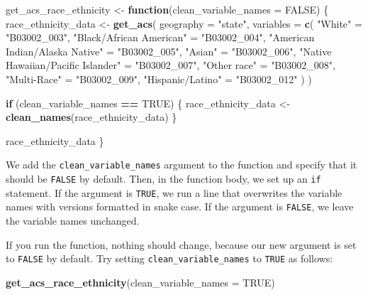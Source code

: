 \documentclass[
]{book}
\newenvironment{Shaded}{\begin{snugshade}}{\end{snugshade}}
\newcommand{\AttributeTok}[1]{\textcolor[rgb]{0.13,0.29,0.53}{#1}}
\newcommand{\ConstantTok}[1]{\textcolor[rgb]{0.56,0.35,0.01}{#1}}
\newcommand{\ControlFlowTok}[1]{\textcolor[rgb]{0.13,0.29,0.53}{\textbf{#1}}}
\newcommand{\FunctionTok}[1]{\textcolor[rgb]{0.13,0.29,0.53}{\textbf{#1}}}
\newcommand{\NormalTok}[1]{#1}
\newcommand{\OtherTok}[1]{\textcolor[rgb]{0.56,0.35,0.01}{#1}}
\newcommand{\SpecialCharTok}[1]{\textcolor[rgb]{0.81,0.36,0.00}{\textbf{#1}}}
\newcommand{\StringTok}[1]{\textcolor[rgb]{0.31,0.60,0.02}{#1}}
\begin{document}
\begin{Shaded}
\begin{Highlighting}[]
\NormalTok{get\_acs\_race\_ethnicity }\OtherTok{\textless{}{-}} \ControlFlowTok{function}\NormalTok{(}\AttributeTok{clean\_variable\_names =} \ConstantTok{FALSE}\NormalTok{) \{}
\NormalTok{  race\_ethnicity\_data }\OtherTok{\textless{}{-}}
    \FunctionTok{get\_acs}\NormalTok{(}
      \AttributeTok{geography =} \StringTok{"state"}\NormalTok{,}
      \AttributeTok{variables =} \FunctionTok{c}\NormalTok{(}
        \StringTok{"White"} \OtherTok{=} \StringTok{"B03002\_003"}\NormalTok{,}
        \StringTok{"Black/African American"} \OtherTok{=} \StringTok{"B03002\_004"}\NormalTok{,}
        \StringTok{"American Indian/Alaska Native"} \OtherTok{=} \StringTok{"B03002\_005"}\NormalTok{,}
        \StringTok{"Asian"} \OtherTok{=} \StringTok{"B03002\_006"}\NormalTok{,}
        \StringTok{"Native Hawaiian/Pacific Islander"} \OtherTok{=} \StringTok{"B03002\_007"}\NormalTok{,}
        \StringTok{"Other race"} \OtherTok{=} \StringTok{"B03002\_008"}\NormalTok{,}
        \StringTok{"Multi{-}Race"} \OtherTok{=} \StringTok{"B03002\_009"}\NormalTok{,}
        \StringTok{"Hispanic/Latino"} \OtherTok{=} \StringTok{"B03002\_012"}
\NormalTok{      )}
\NormalTok{    )}

  \ControlFlowTok{if}\NormalTok{ (clean\_variable\_names }\SpecialCharTok{==} \ConstantTok{TRUE}\NormalTok{) \{}
\NormalTok{    race\_ethnicity\_data }\OtherTok{\textless{}{-}} \FunctionTok{clean\_names}\NormalTok{(race\_ethnicity\_data)}
\NormalTok{  \}}

\NormalTok{  race\_ethnicity\_data}
\NormalTok{\}}
\end{Highlighting}
\end{Shaded}

We add the \texttt{clean\_variable\_names} argument to the function and specify that it should be \texttt{FALSE} by default. Then, in the function body, we set up an \texttt{if} statement. If the argument is \texttt{TRUE}, we run a line that overwrites the variable names with versions formatted in snake case. If the argument is \texttt{FALSE}, we leave the variable names unchanged.

If you run the function, nothing should change, because our new argument is set to \texttt{FALSE} by default. Try setting \texttt{clean\_variable\_names} to \texttt{TRUE} as follows:

\begin{Shaded}
\begin{Highlighting}[]
\FunctionTok{get\_acs\_race\_ethnicity}\NormalTok{(}\AttributeTok{clean\_variable\_names =} \ConstantTok{TRUE}\NormalTok{)}
\end{Highlighting}
\end{Shaded}
\end{document}
